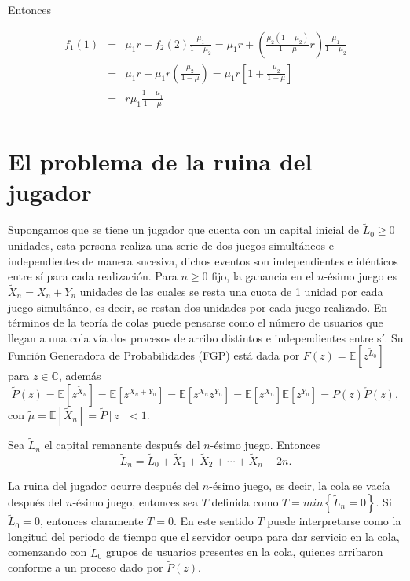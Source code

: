 \documentclass{article}
\newcommand{\esp}{\mathbb{E}}
\begin{document}
Entonces

\begin{eqnarray*}
f_{1}\left(1\right)&=&\mu_{1}r+f_{2}\left(2\right)\frac{\mu_{1}}{1-\mu_{2}}=\mu_{1}r+\left(\frac{\mu_{2}\left(1-\mu_{2}\right)}{1-\mu}r\right)\frac{\mu_{1}}{1-\mu_{2}}\\
&=&\mu_{1}r+\mu_{1}r\left(\frac{\mu_{2}}{1-\mu}\right)=\mu_{1}r\left[1+\frac{\mu_{2}}{1-\mu}\right]\\
&=&r\mu_{1}\frac{1-\mu_{1}}{1-\mu}\\
\end{eqnarray*}

\section{El problema de la ruina del jugador}

Supongamos que se tiene un jugador que cuenta con un capital inicial de $\tilde{L}_{0}\geq0$ unidades, esta persona realiza una serie de dos juegos simult\'aneos e independientes de manera sucesiva, dichos eventos son independientes e id\'enticos entre s\'i para cada realizaci\'on. Para $n\geq0$ fijo, la ganancia en el $n$-\'esimo juego es $\tilde{X}_{n}=X_{n}+Y_{n}$ unidades de las cuales se resta una cuota de 1 unidad por cada juego simult\'aneo, es decir, se restan dos unidades por cada juego realizado. En t\'erminos de la teor\'ia de colas puede pensarse como el n\'umero de usuarios que llegan a una cola v\'ia dos procesos de arribo distintos e independientes entre s\'i. Su Funci\'on Generadora de Probabilidades (FGP) est\'a dada por $F\left(z\right)=\esp\left[z^{\tilde{L}_{0}}\right]$ para $z\in\mathbb{C}$, adem\'as
$$\tilde{P}\left(z\right)=\esp\left[z^{\tilde{X}_{n}}\right]=\esp\left[z^{X_{n}+Y_{n}}\right]=\esp\left[z^{X_{n}}z^{Y_{n}}\right]=\esp\left[z^{X_{n}}\right]\esp\left[z^{Y_{n}}\right]=P\left(z\right)\check{P}\left(z\right),$$ con $\tilde{\mu}=\esp\left[\tilde{X}_{n}\right]=\tilde{P}\left[z\right]<1$. 

Sea $\tilde{L}_{n}$ el capital remanente despu\'es del $n$-\'esimo
juego. Entonces
$$\tilde{L}_{n}=\tilde{L}_{0}+\tilde{X}_{1}+\tilde{X}_{2}+\cdots+\tilde{X}_{n}-2n.$$

La ruina del jugador ocurre despu\'es del $n$-\'esimo juego, es decir, la cola se vac\'ia despu\'es del $n$-\'esimo juego, entonces sea $T$ definida como $T=min\left\{\tilde{L}_{n}=0\right\}$. Si $\tilde{L}_{0}=0$, entonces claramente $T=0$. En este sentido $T$ puede interpretarse como la longitud del periodo de tiempo que el servidor ocupa para dar servicio en la cola, comenzando con $\tilde{L}_{0}$ grupos de usuarios presentes en la cola, quienes arribaron conforme a un proceso dado por $\tilde{P}\left(z\right)$.
\end{document}
